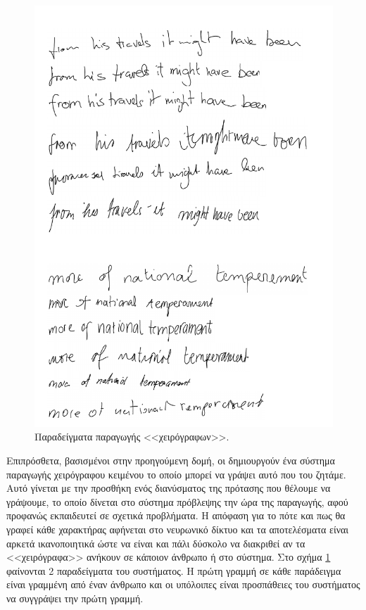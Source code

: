 \begin{figure}[tph]
	\includegraphics[width=\textwidth, keepaspectratio]{images/handwriting.png}
	\centering 
	\caption{Παραδείγματα παραγωγής <<χειρόγραφων>>.}
	\label{fig:handwriting}
\end{figure}

Επιπρόσθετα, βασισμένοι στην προηγούμενη δομή, οι  δημιουργούν ένα σύστημα παραγωγής χειρόγραφου κειμένου το οποίο μπορεί να γράψει αυτό που του ζητάμε.
Αυτό γίνεται με την προσθήκη ενός διανύσματος της πρότασης που θέλουμε να γράψουμε, το οποίο δίνεται στο σύστημα πρόβλεψης την ώρα της παραγωγής, αφού προφανώς εκπαιδευτεί σε σχετικά προβλήματα.
Η απόφαση για το πότε και πως θα γραφεί κάθε χαρακτήρας αφήνεται στο νευρωνικό δίκτυο και τα αποτελέσματα είναι αρκετά ικανοποιητικά ώστε να είναι και πάλι δύσκολο να διακριθεί αν τα <<χειρόγραφα>> ανήκουν σε κάποιον άνθρωπο ή στο σύστημα.
Στο σχήμα \ref{fig:handwriting} φαίνονται 2 παραδείγματα του συστήματος. Η πρώτη γραμμή σε κάθε παράδειγμα είναι γραμμένη από έναν άνθρωπο και οι υπόλοιπες είναι προσπάθειες του συστήματος να συγγράψει την πρώτη γραμμή.


